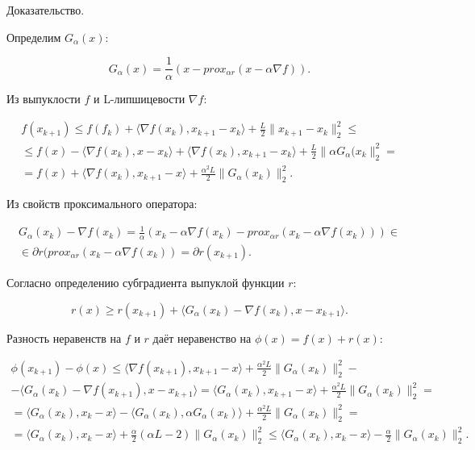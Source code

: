 Доказательство.

Определим $ G_\alpha(x)$:

\begin{equation}
    G_\alpha(x)=\frac1\alpha\left(x-prox_{\alpha r}(x-\alpha\nabla f)\right).
\end{equation}

Из выпуклости $f$ и L-липшицевости $\nabla f$:

\begin{equation}
\begin{aligned}
    f(x_{k+1})\leq
    f(f_k)+\langle\nabla f(x_k),x_{k+1}-x_k\rangle+\frac L2\|x_{k+1}-x_k\|_2^2\leq\\\leq
    f(x)-\langle\nabla f(x_k),x-x_k\rangle+\langle\nabla f(x_k),x_{k+1}-x_k\rangle+\frac L2\|\alpha G_\alpha(x_k\|_2^2=\\=
    f(x)+\langle\nabla f(x_k),x_{k+1}-x\rangle+\frac{\alpha^2L}2\|G_\alpha(x_k)\|_2^2.
\end{aligned}
\end{equation}

Из свойств проксимального оператора:

\begin{equation}
\begin{aligned}
    G_\alpha(x_k)-\nabla f(x_k)=
    \frac1\alpha\left(x_k-\alpha\nabla f(x_k)-prox_{\alpha r}(x_k-\alpha\nabla f(x_k))\right)\in\\\in\partial r(prox_{\alpha r}(x_k-\alpha\nabla f(x_k))=\partial r(x_{k+1}).
\end{aligned}
\end{equation}

Согласно определению субградиента выпуклой функции $r$:

\begin{equation}
    r(x)\geq r(x_{k+1})+\langle G_\alpha(x_k)-\nabla f(x_k),x-x_{k+1}\rangle.
\end{equation}

Разность неравенств на $f$ и $r$ даёт неравенство на $\phi(x)=f(x)+r(x)$:

\begin{equation}
\begin{aligned}
    \phi(x_{k+1})-\phi(x)\leq\langle\nabla f(x_{k+1}),x_{k+1}-x\rangle+\frac{\alpha^2L}2\|G_\alpha(x_k)\|_2^2-\\-\langle G_\alpha(x_k)-\nabla f(x_{k+1}),x-x_{k+1}\rangle=
    \langle G_\alpha(x_k),x_{k+1}-x\rangle+\frac{\alpha^2L}2\|G_\alpha(x_k)\|_2^2=\\=
    \langle G_\alpha(x_k),x_k-x\rangle-\langle G_\alpha(x_k),\alpha G_\alpha(x_k)\rangle+\frac{\alpha^2L}2\|G_\alpha(x_k)\|_2^2=\\=
    \langle G_\alpha(x_k),x_k-x\rangle+\frac\alpha2(\alpha L-2)\|G_\alpha(x_k)\|_2^2\leq
    \langle G_\alpha(x_k),x_k-x\rangle-\frac\alpha2\|G_\alpha(x_k)\|_2^2.
\end{aligned}
\end{equation}

